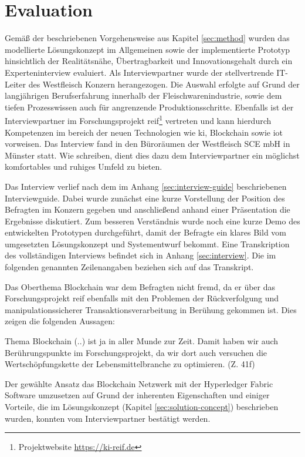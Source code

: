 \section{Evaluation} \label{sec:evaluation}
Gemäß der beschriebenen Vorgehensweise aus Kapitel \ref{sec:method} wurden das modellierte Lösungskonzept im Allgemeinen sowie der implementierte Prototyp hinsichtlich der Realitätsnähe, Übertragbarkeit und Innovationsgehalt durch ein Experteninterview evaluiert. Als Interviewpartner wurde der stellvertrende IT-Leiter des Westfleisch Konzern herangezogen. Die Auswahl erfolgte auf Grund der langjährigen Berufserfahrung innerhalb der Fleischwarenindustrie, sowie dem tiefen Prozesswissen auch für angrenzende Produktionsschritte. Ebenfalls ist der Interviewpartner im Forschungsprojekt \ac{reif}\footnote{Projektwebsite \url{https://ki-reif.de}} vertreten und kann hierdurch Kompetenzen im bereich der neuen Technologien wie \acf{ki}, Blockchain sowie \acf{iot} vorweisen. Das Interview fand in den Büroräumen der Westfleisch SCE mbH in Münster statt. Wie \citet{Ritchie2013} schreiben, dient dies dazu dem Interviewpartner ein möglichst komfortables und ruhiges Umfeld zu bieten.

Das Interview verlief nach dem im Anhang \ref{sec:interview-guide} beschriebenen Interviewguide. Dabei wurde zunächst eine kurze Vorstellung der Position des Befragten im Konzern gegeben und anschließend anhand einer Präsentation die Ergebnisse diskutiert. Zum besseren Verständnis wurde noch eine kurze Demo des entwickelten Prototypen durchgeführt, damit der Befragte ein klares Bild vom umgesetzten Lösungskonzept und Systementwurf bekommt. Eine Transkription des vollständigen Interviews befindet sich in Anhang \ref{sec:interview}. Die im folgenden genannten Zeilenangaben beziehen sich auf das Transkript.

Das Oberthema Blockchain war dem Befragten nicht fremd, da er über das Forschungsprojekt \ac{reif} ebenfalls mit den Problemen der Rückverfolgung und manipulationssicherer Transaktionsverarbeitung in Berühung gekommen ist. Dies zeigen die folgenden Aussagen:

\begin{displayquote}
    \glqq Thema Blockchain (..) ist ja in aller Munde zur Zeit. Damit haben wir auch Berührungspunkte im Forschungsprojekt, da wir dort auch versuchen die Wertschöpfungskette der Lebensmittelbranche zu optimieren.\grqq{} (Z. 41f)
\end{displayquote}

Der gewählte Ansatz das Blockchain Netzwerk mit der Hyperledger Fabric Software umzusetzen auf Grund der inherenten Eigenschaften und einiger Vorteile, die im Lösungskonzept (Kapitel \ref{sec:solution-concept}) beschrieben wurden, konnten vom Interviewpartner bestätigt werden.

